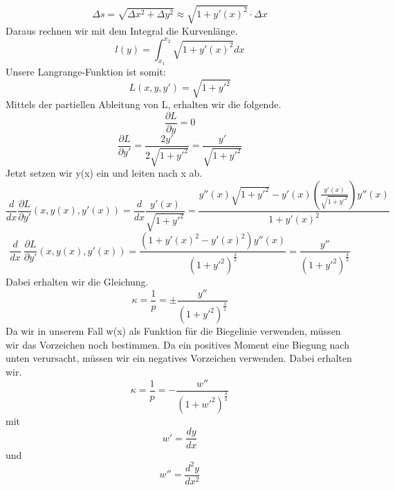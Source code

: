 \begin{equation}
	\Delta s=
	\sqrt{\Delta x^2+\Delta y^2}\approx\sqrt{1+y'(x)^2}\cdot\Delta x
\end{equation}
Daraus rechnen wir mit dem Integral die Kurvenlänge.
\begin{equation}
	l(y)=
	\int_{x_1}^{x_2}\sqrt{1+{y'(x)}^2}dx
\end{equation}
Unsere Langrange-Funktion ist somit:
\begin{equation}
	L(x,y,y')=
	\sqrt{1+{y'}^2}
\end{equation}
Mittels der partiellen Ableitung von L, erhalten wir die folgende.
\begin{equation}
	\frac{\partial L}{\partial y}=
	0
\end{equation}
\begin{equation}
	\frac{\partial L}{\partial y'}=
	\frac{2y'}{2\sqrt{1+{y'}^2}}=
	\frac{y'}{\sqrt{1+{y'}^2}}
\end{equation}
Jetzt setzen wir y(x) ein und leiten nach x ab.
\begin{equation}
	\frac{d}{dx}\frac{\partial L}{\partial y'}(x,y(x),y'(x))=
	\frac{d}{dx}\frac{y'(x)}{\sqrt{1+{y'}^2}}=
	\frac{y''(x)\sqrt{1+{y'}^2}-y'(x)\left(\frac{y'(x)}{\sqrt{1+{y'}^2}}\right)y''(x)}{1+{y'(x)}^2}
\end{equation}
\begin{equation}
	\frac{d}{dx}\ \frac{\partial L}{\partial y'}(x,y(x),y'(x))=
	\frac{(1+{y'(x)}^2-{y'(x)}^2)y''(x)}{\left(1+{y'}^2\right)^\frac{3}{2}}=
	\frac{y''}{\left(1+{y'}^2\right)^\frac{3}{2}}
\end{equation}
Dabei erhalten wir die Gleichung.
\begin{equation}
	\kappa=
	\frac{1}{p}=
	\pm\frac{y''}{\left(1+{y'}^2\right)^\frac{3}{2}}
\end{equation}
Da wir in unserem Fall w(x) als Funktion für die Biegelinie verwenden, müssen wir das Vorzeichen noch bestimmen.
Da ein positives Moment eine Biegung nach unten verursacht, müssen wir ein negatives Vorzeichen verwenden. Dabei erhalten wir.
\begin{equation}
	\kappa=
	\frac{1}{p}=
	-\frac{w''}{\left(1+{w'}^2\right)^\frac{3}{2}}
\end{equation}
mit
\begin{equation}
	w'=
	\frac{dy}{dx} 
\end{equation}
und
\begin{equation}
	w''=
	\frac{d^2y}{dx^2}
\end{equation}

